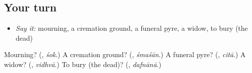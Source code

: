 \subsection*{Your turn}
\begin{itemize}
\raggedright
  \item \emph{Say it:} mourning, a cremation ground, a funeral pyre, a widow, to bury (the dead)
\end{itemize}

\begin{tcolorbox}[breakable,colback=teal!4,colframe=teal!35!black,title={Before you move on}]
Mourning? (\textbf{}, \emph{śok}.) A cremation ground? (\textbf{}, \emph{śmaśān}.) A funeral pyre? (\textbf{}, \emph{citā}.) A widow? (\textbf{}, \emph{vidhvā}.) To bury (the dead)? (\textbf{}, \emph{dafnānā}.)
\end{tcolorbox}
